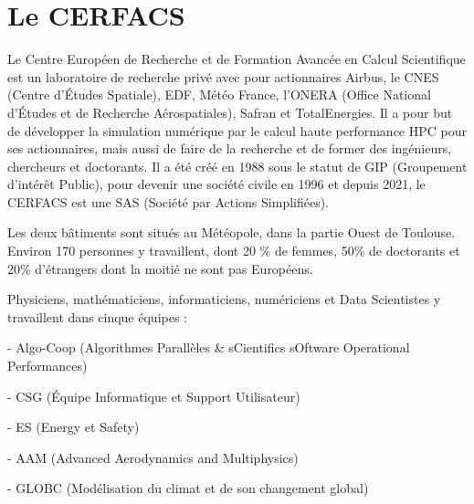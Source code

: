 \chapter{Le CERFACS}

Le Centre Européen de Recherche et de Formation Avancée en Calcul Scientifique est un laboratoire de recherche privé avec pour actionnaires Airbus, le CNES (Centre d'Études Spatiale), EDF, Météo France, l'ONERA (Office National d'Études et de Recherche Aérospatiales), Safran et TotalEnergies. Il a pour but de développer la simulation numérique par le calcul haute performance \ac{HPC} pour ses actionnaires, mais aussi de faire de la recherche et de former des ingénieurs, chercheurs et doctorants. Il a été créé en 1988 sous le statut de GIP (Groupement d’intérêt Public), pour devenir une société civile en 1996 et depuis 2021, le CERFACS est une SAS (Société par Actions Simplifiées).

Les deux bâtiments sont situés au Météopole, dans la partie Ouest de Toulouse. Environ 170 personnes y travaillent, dont 20 \% de femmes, 50\% de doctorants et 20\% d'étrangers dont la moitié ne sont pas Européens.

Physiciens, mathématiciens, informaticiens, numériciens et Data Scientistes y travaillent dans cinque équipes :


- Algo-Coop (Algorithmes Parallèles \& sCientifics sOftware Operational Performances)

- CSG (Équipe Informatique et Support Utilisateur)

- ES (Energy et Safety)

- AAM (Advanced Aerodynamics and Multiphysics)

- GLOBC (Modélisation du climat et de son changement global)



